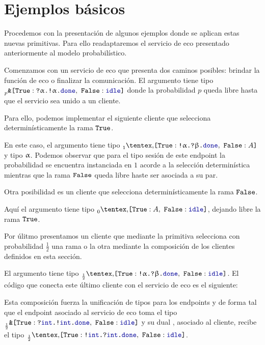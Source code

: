 \section{Ejemplos básicos}

Procedemos con la presentación de algunos ejemplos donde se aplican estas
nuevas primitivas. Para ello readaptaremos el servicio de eco presentado
anteriormente al modelo probabilístico.

\SimpleProbEchoService

Comenzamos con un servicio de eco que presenta dos caminos posibles: brindar
la función de eco o finalizar la comunicación. El argumento  tiene tipo
$\BinaryPBranch[p]{\In\tvarA\Out\tvarA\Done}{\Idle}$ donde la probabilidad $p$
queda libre hasta que el servicio sea unido a un cliente.

Para ello, podemos implementar el siguiente cliente que selecciona
determinísticamente la rama $\Tag[True]$.

\SimpleProbEchoClient

En este caso, el argumento  tiene tipo
$\BinaryPChoice[1]{\Out\tvarA\In\tvarB\Done}{\etvar}$ y  tipo $\tvarA$.
Podemos observar que para el tipo sesión de este endpoint la probabilidad se
encuentra instanciada en $1$ acorde a la selección determinística mientras que
la rama $\Tag[False]$ queda libre haste ser asociada a su par.

Otra posibilidad es un cliente que selecciona determinísticamente la rama
$\Tag[False]$.

\SimpleIdleClient

Aquí el argumento  tiene tipo $\BinaryPChoice[0]{\etvar}{\Idle}$,
dejando libre la rama $\Tag[True]$.

Por úlitmo presentamos un cliente que mediante la primitiva 
selecciona con probabilidad $\frac{1}{2}$ una rama o la otra mediante
la composición de los clientes definidos en esta sección.

\SimpleCoinFlipEchoClient

El argumento  tiene tipo
$\BinaryPChoice[\frac{1}{2}]{\Out\tvarA\In\tvarB\Done}{\Idle}$. El código que
conecta este último cliente con el servicio de eco es el siguiente:

\SimpleCoinFlipEchoMain

Esta composición fuerza la unificación de tipos para los endpoints  y
 de forma tal que el endpoint  asociado al servicio de eco toma el
tipo $\BinaryPBranch[\frac{1}{2}]{\In\tint\Out\tint\Done}{\Idle}$ y
su dual , asociado al cliente, recibe el tipo
$\BinaryPChoice[\frac{1}{2}]{\Out\tint\In\tint\Done}{\Idle}$.
